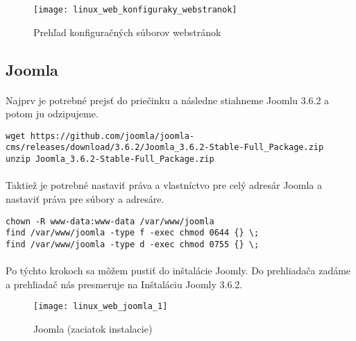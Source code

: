 \begin{figure}[!htb]
\centering
\texttt{[image: linux\_web\_konfiguraky\_webstranok]}
\caption{Prehľad konfiguračných súborov webstránok}
\label{fig:web_config_files_list}
\end{figure}

\subsection{Joomla}
\paragraph{}
Najprv je potrebné prejsť do priečinku  a následne stiahneme Joomlu 3.6.2 a potom ju odzipujeme.

\noindent
{\selectfont
\begin{small}
\begin{verbatim}
wget https://github.com/joomla/joomla-cms/releases/download/3.6.2/Joomla_3.6.2-Stable-Full_Package.zip
unzip Joomla_3.6.2-Stable-Full_Package.zip
\end{verbatim}
\end{small}
}

\paragraph{}
Taktiež je potrebné nastaviť práva a vlastníctvo pre celý adresár Joomla a nastaviť práva pre súbory a adresáre.

\noindent
{\selectfont
\begin{small}
\begin{verbatim}
chown -R www-data:www-data /var/www/joomla
find /var/www/joomla -type f -exec chmod 0644 {} \;
find /var/www/joomla -type d -exec chmod 0755 {} \;
\end{verbatim}
\end{small}
}

\paragraph{}
Po týchto krokoch sa môžem pustiť do inštalácie Joomly. Do prehliadača zadáme  a prehliadač nás presmeruje na Inštaláciu Joomly 3.6.2.

\begin{figure}[!htb]
\centering
\texttt{[image: linux\_web\_joomla\_1]}
\caption{ Joomla (zaciatok instalacie)}
\label{fig:web_joomla_begin}
\end{figure}

